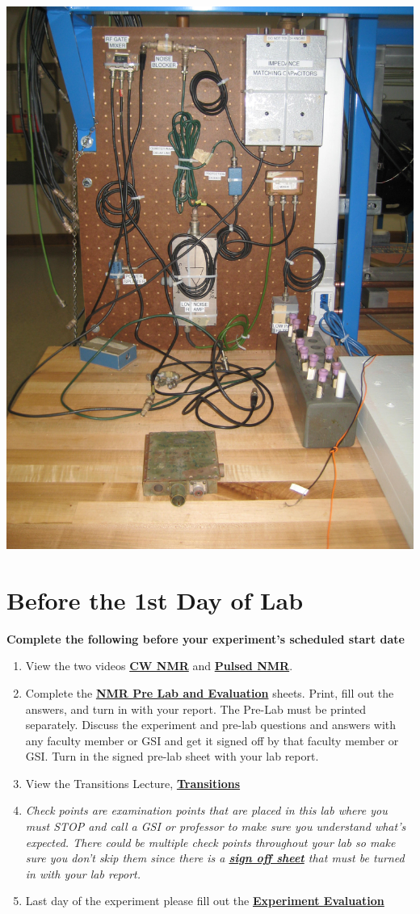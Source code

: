\documentclass{../lab}
\begin{document}
\href{http://experimentationlab.berkeley.edu/sites/default/files/images/PNMR_3495.jpg}{\includegraphics[width=0.33\linewidth,keepaspectratio]{images/PNMR_3495.jpg}}

\section{Before the 1st Day of Lab}

\textbf{Complete the following before your experiment's scheduled start date}

\begin{enumerate}
    \item View the two videos \href{http://youtu.be/q\_Rtbr7YEJY}{\textbf{CW NMR}} and \href{http://youtu.be/\_sXDn-ChOUY}{\textbf{Pulsed NMR}}.

    \item Complete the \href{http://experimentationlab.berkeley.edu/NMRPreLab}{\textbf{NMR Pre Lab and Evaluation}} sheets. Print, fill out the answers, and turn in with your report. The Pre-Lab must be printed separately. Discuss the experiment and pre-lab questions and answers with any faculty member or GSI and get it signed off by that faculty member or GSI. Turn in the signed pre-lab sheet with your lab report.

    \item View the Transitions Lecture, \href{http://youtu.be/xOMgdVP3AfE}{\textbf{Transitions}}

    \item \emph{Check points are examination points that are placed in this lab where you must STOP and call a GSI or professor to make sure you understand what's expected. There could  be multiple check points throughout your lab so make sure you don't skip them since there is a \href{http://experimentationlab.berkeley.edu/nmrcheckpoints}{\textbf{sign off sheet}} that must be turned in with your lab report.}

    \item Last day of the experiment please fill out the \href{\ExperimentEvaluation}{\textbf{Experiment Evaluation}}

\end{enumerate}
\end{document}
